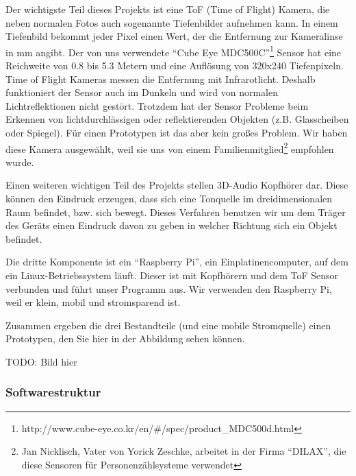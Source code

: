\documentclass[a4paper,12pt,ngerman]{scrartcl}
\begin{document}
Der wichtigste Teil dieses Projekts ist eine ToF (Time of Flight) Kamera, die neben normalen Fotos 
auch sogenannte Tiefenbilder aufnehmen kann.
In einem Tiefenbild bekommt jeder Pixel einen Wert, der die Entfernung zur Kameralinse in mm angibt.
Der von uns verwendete \enquote{Cube Eye MDC500C}\footnote{http://www.cube-eye.co.kr/en/\#/spec/product\_MDC500d.html}
Sensor hat eine Reichweite von 0.8 bis 5.3 Metern und eine Auflösung von 320x240 Tiefenpixeln. 
Time of Flight Kameras messen die Entfernung mit Infrarotlicht. Deshalb funktioniert der Sensor auch 
im Dunkeln und wird von normalen Lichtreflektionen nicht gestört. Trotzdem hat der Sensor Probleme beim
Erkennen von lichtdurchlässigen oder reflektierenden Objekten (z.B. Glasscheiben oder Spiegel). Für einen
Prototypen ist das aber kein großes Problem. Wir haben diese Kamera ausgewählt, weil sie uns von einem 
Familienmitglied\footnote{Jan Nicklisch, Vater von Yorick Zeschke, arbeitet in der Firma
	\enquote{DILAX}, die diese Sensoren für Personenzählsysteme verwendet} 
empfohlen wurde.\par
Einen weiteren wichtigen Teil des Projekts stellen 3D-Audio Kopfhörer dar. Diese können den Eindruck
erzeugen, dass sich eine Tonquelle im dreidimensionalen
Raum befindet, bzw. sich bewegt. Dieses Verfahren benutzen wir um dem Träger des Geräts einen Eindruck
davon zu geben in welcher Richtung sich ein Objekt befindet.\par 
Die dritte Komponente ist ein \enquote{Raspberry Pi}, ein 
Einplatinencomputer, auf dem ein Linux-Betriebssystem läuft. Dieser ist mit Kopfhörern und dem ToF Sensor 
verbunden und führt unser Programm aus. Wir verwenden den Raspberry Pi, weil er klein, mobil und 
stromsparend ist.\par 
Zusammen ergeben die drei Bestandteile (und eine mobile Stromquelle) einen Prototypen, den Sie hier 
in der Abbildung sehen können.
\par 
TODO: Bild hier 

\subsubsection{Softwarestruktur}
\end{document}

